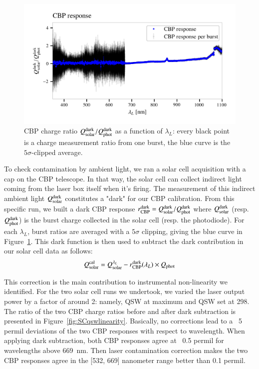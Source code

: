 \begin{figure}[h]
    \centering
    \includegraphics[width=\columnwidth]{fig/sc_dark_qswMAX.png}
    \caption{CBP charge ratio $Q_{\mathrm{solar}}^{\rm dark}/Q_{\mathrm{phot}}^{\rm dark}$ as a function of $\lambda_L$: every black point is a charge measurement ratio from one burst, the blue curve is the $5\sigma$-clipped average.}
    \label{fig:sc_dark}
\end{figure}

To check contamination by ambient light, we ran a solar cell acquisition with a cap on the CBP telescope. In that way, the solar cell can collect indirect light coming from the laser box itself when it's firing. The measurement of this indirect ambient light $Q_{\mathrm{solar}}^{\rm dark}$ constitutes a "dark" for our CBP calibration. From this specific run, we built a dark CBP response $r_{\mathrm{CBP}}^{\rm dark} = Q_{\mathrm{solar}}^{\rm dark} / Q_{\mathrm{phot}}^{\rm dark}$ where $Q_{\mathrm{solar}}^{\rm dark}$ (resp. $Q_{\mathrm{phot}}^{\rm dark}$) is the burst charge collected in the solar cell (resp. the photodiode). For each $\lambda_L$, burst ratios are averaged with a $5\sigma$ clipping, giving the blue curve in Figure~\ref{fig:sc_dark}. This dark function is then used to subtract the dark contribution in our solar cell data as follows:
\begin{equation}
    Q_{\mathrm{solar}}^{\rm cal} = Q_{\mathrm{solar}}^{\lambda_L} - r_{\mathrm{CBP}}^{\rm dark}(\lambda_L) \times Q_{\mathrm{phot}} \end{equation}

This correction is the main contribution to instrumental non-linearity we identified. For the two solar cell runs we undertook, we varied the laser output power by a factor of around 2: namely, QSW at maximum and QSW set at 298. The ratio of the two CBP charge ratios before and after dark subtraction is presented in Figure~\ref{fig:SCqswlinearity}. Basically, no corrections lead to a ~5 permil deviations of the two CBP responses with respect to wavelength. When applying dark subtraction, both CBP responses agree at ~0.5 permil for wavelengths above \SI{669}{\nm}. Then laser contamination correction makes the two CBP responses agree in the [532, 669] nanometer range better than 0.1 permil. 

